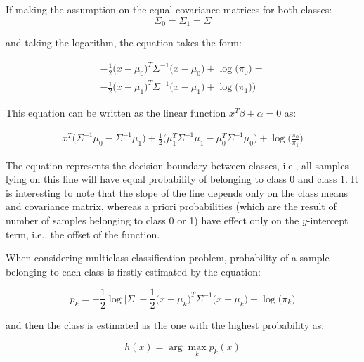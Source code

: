 \documentclass{article}
\newcommand{\argmax}{\arg\!\max} %
\begin{document}
If making the assumption on the equal covariance matrices for both classes:
\begin{equation} 
\Sigma_0 = \Sigma_1  = \Sigma
\end{equation}

and taking the logarithm, the equation takes the form: 

\begin{equation} 
\begin{split}
-\frac{1}{2}  \Big(x-\mu_0\Big)^T  \Sigma^{-1} \Big(x-\mu_0\Big) +  \log{\Big(\pi_0\Big)}= \\
-\frac{1}{2}  \Big(x-\mu_1\Big)^T  \Sigma^{-1} \Big(x-\mu_1\Big) +  \log{\Big(\pi_1)\Big)}
\end{split}
\end{equation}

This equation can be written as the linear function $x^T\beta + \alpha = 0$ as:

\begin{equation} 
\begin{split}
x^T\Big(\Sigma^{-1} \mu_0 - \Sigma^{-1} \mu_1\Big) + \frac{1}{2} \Big(\mu_1^T \Sigma^{-1}\mu_1 - \mu_0^T \Sigma^{-1}\mu_0\Big)
+ \log\Big( \frac{\pi_0}{\pi_1}  \Big)
\end{split}
\end{equation}

The equation represents the decision boundary between classes, i.e., all samples lying on this line will have equal probability of belonging to class 0 and class 1. It is interesting to note that the slope of the line depends only on the class means and covariance matrix, whereas a priori probabilities (which are the result of number of samples belonging to class 0 or 1) have effect only on the $y$-intercept term, i.e., the offset of the function.

When considering multiclass classification problem, probability of a sample belonging to each class is firstly estimated by the equation:

\begin{equation}
p_k = -\frac{1}{2} \log \big\vert \Sigma \big\vert - \frac{1}{2}  \Big(x-\mu_k\Big)^T  \Sigma^{-1} \Big(x-\mu_k\Big) +  \log{\Big(\pi_k\Big)}
\end{equation}

and then the class is estimated as the one with the highest probability as:

\begin{equation} 
h(x) = \argmax_k p_k(x)
\end{equation}
\end{document}
